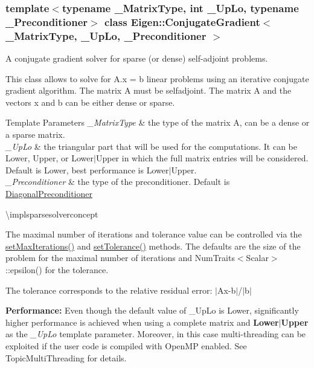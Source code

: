 \subsubsection*{template$<$typename \+\_\+\+Matrix\+Type, int \+\_\+\+Up\+Lo, typename \+\_\+\+Preconditioner$>$\newline
class Eigen\+::\+Conjugate\+Gradient$<$ \+\_\+\+Matrix\+Type, \+\_\+\+Up\+Lo, \+\_\+\+Preconditioner $>$}

A conjugate gradient solver for sparse (or dense) self-\/adjoint problems. 

This class allows to solve for A.\+x = b linear problems using an iterative conjugate gradient algorithm. The matrix A must be selfadjoint. The matrix A and the vectors x and b can be either dense or sparse.


\begin{DoxyTemplParams}{Template Parameters}
{\em \+\_\+\+Matrix\+Type} & the type of the matrix A, can be a dense or a sparse matrix. \\
\hline
{\em \+\_\+\+Up\+Lo} & the triangular part that will be used for the computations. It can be Lower, {\ttfamily Upper}, or {\ttfamily Lower$\vert$\+Upper} in which the full matrix entries will be considered. Default is {\ttfamily Lower}, best performance is {\ttfamily Lower$\vert$\+Upper}. \\
\hline
{\em \+\_\+\+Preconditioner} & the type of the preconditioner. Default is \mbox{\hyperlink{class_eigen_1_1_diagonal_preconditioner}{Diagonal\+Preconditioner}}\\
\hline
\end{DoxyTemplParams}
\textbackslash{}implsparsesolverconcept

The maximal number of iterations and tolerance value can be controlled via the \mbox{\hyperlink{class_eigen_1_1_iterative_solver_base_af83de7a7d31d9d4bd1fef6222b07335b}{set\+Max\+Iterations()}} and \mbox{\hyperlink{class_eigen_1_1_iterative_solver_base_ac160a444af8998f93da9aa30e858470d}{set\+Tolerance()}} methods. The defaults are the size of the problem for the maximal number of iterations and Num\+Traits$<$\+Scalar$>$\+::epsilon() for the tolerance.

The tolerance corresponds to the relative residual error\+: $\vert$\+Ax-\/b$\vert$/$\vert$b$\vert$

{\bfseries{Performance\+:}} Even though the default value of {\ttfamily \+\_\+\+Up\+Lo} is {\ttfamily Lower}, significantly higher performance is achieved when using a complete matrix and {\bfseries{Lower$\vert$\+Upper}} as the {\itshape \+\_\+\+Up\+Lo} template parameter. Moreover, in this case multi-\/threading can be exploited if the user code is compiled with Open\+MP enabled. See Topic\+Multi\+Threading for details.

